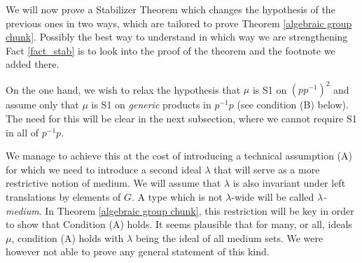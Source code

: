 \documentclass[12pt]{article}
\theoremstyle{definition}
\theoremstyle{mystyle}
\theoremstyle{remark}
\begin{document}
We will now prove a Stabilizer Theorem which changes the
hypothesis of the previous ones in two ways, which are tailored to
prove Theorem \ref{algebraic group chunk}. Possibly the best way
to understand in which way we are strengthening Fact
\ref{fact_stab} is to look into the proof of the theorem and the
footnote we added there.

On the one hand, we wish to relax the hypothesis that $\mu$ is S1
on $(pp^{-1})^2$ and assume only that $\mu$ is S1 on
\emph{generic} products in $p^{-1}p$ (see condition (B) below).
The need for this will be clear in the next subsection, where we
cannot require S1 in all of $p^{-1}p$.

We manage to achieve this at the cost of introducing a technical
assumption (A) for which we need to introduce a second ideal $\lambda$
that will serve as a more restrictive notion of medium.
We will assume
that $\lambda$ is also invariant under left translations by
elements of $G$. A type which is not $\lambda$-wide will be called
\emph{$\lambda$-medium}. In Theorem \ref{algebraic group chunk},
this restriction will be key in order to show that Condition (A)
holds. It seems plausible that for many, or all, ideals $\mu$, condition (A)
holds with $\lambda$ being the ideal of all medium sets. We were
however not able to prove any general statement of this kind.
\end{document}
